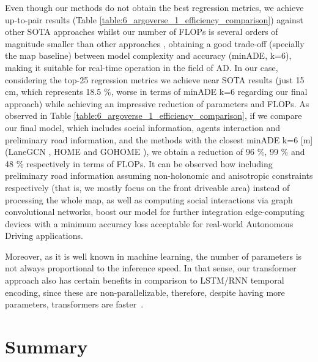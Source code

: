 Even though our methods do not obtain the best regression metrics, we achieve up-to-pair results (Table \ref{table:6_argoverse_1_efficiency_comparison}) against other SOTA approaches whilst our number of FLOPs is several orders of magnitude smaller than other approaches \cite{gu2021densetnt} \cite{liang2020learning}, obtaining a good trade-off (specially the map baseline) between model complexity and accuracy (minADE, k=6), making it suitable for real-time operation in the field of AD. In our case, considering the top-25 regression metrics we achieve near SOTA results (just 15 cm, which represents 18.5 \%, worse in terms of minADE k=6 regarding our final approach) while achieving an impressive reduction of parameters and FLOPs. As observed in Table \ref{table:6_argoverse_1_efficiency_comparison}, if we compare our final model, which includes social information, agents interaction and preliminary road information, and the methods with the closest minADE k=6 [m] (LaneGCN \cite{liang2020learning}, HOME \cite{gilles2021home} and GOHOME \cite{gilles2022gohome}), we obtain a reduction of 96 \%, 99 \% and 48 \% respectively in terms of FLOPs. It can be observed how including preliminary road information assuming non-holonomic \cite{triggs1993motion} and anisotropic \cite{ross1989planning} constraints respectively (that is, we mostly focus on the front driveable area) instead of processing the whole map, as well as computing social interactions via graph convolutional networks, boost our model for further integration edge-computing devices with a minimum accuracy loss acceptable for real-world Autonomous Driving applications.


Moreover, as it is well known in machine learning, the number of parameters is not always proportional to the inference speed. In that sense, our transformer approach also has certain benefits in comparison to LSTM/RNN temporal encoding, since these are non-parallelizable, therefore, despite having more parameters, transformers are faster~\cite{vaswani2017attention}.

\section{Summary}
\label{sec:6_summary}

